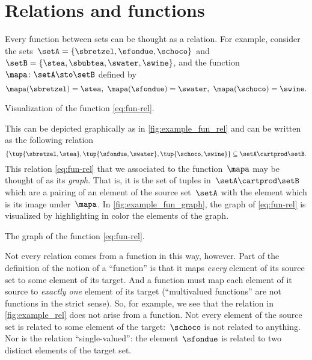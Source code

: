 
\section{Relations and functions}


Every function between sets can be thought as a relation.
For example, consider the sets~$\setA = \{ \sbretzel, \sfondue, \schoco \}$ and~$\setB = \{ \stea, \sbubtea, \swater, \swine \}$, and the function~$\mapa \colon \setA \sto \setB$ defined by
\begin{equation}
    \mapa (\sbretzel) = \stea, \ \mapa (\sfondue) = \swater, \ \mapa(\schoco) = \swine.
\end{equation}
\begin{marginfigure}
    \centering
    \caption{Visualization of the function \cref{eq:fun-rel}.}
    \label{fig:example_fun_rel}
\end{marginfigure}
This can be depicted graphically as in \cref{fig:example_fun_rel} and can be written as the following relation
\begin{equation}
    \label{eq:fun-rel}
    \{ \tup{\sbretzel, \stea}, \tup{\sfondue, \swater}, \tup{\schoco, \swine} \} \subseteq \setA \cartprod \setB.
\end{equation}
This relation \cref{eq:fun-rel} that we associated to the function~$\mapa$ may be thought of as its \emph{graph}.
That is, it is the set of tuples in~$\setA \cartprod \setB$ which are a pairing of an element of the source set~$\setA$ with the element which is its image under~$\mapa$.
In \cref{fig:example_fun_graph}, the graph of \cref{eq:fun-rel} is visualized by highlighting in color the elements of the graph.
\begin{marginfigure}
    \centering
    \caption{The graph of the function \cref{eq:fun-rel}.}
    \label{fig:example_fun_graph}
\end{marginfigure}

Not every relation comes from a function in this way, however.
Part of the definition of the notion of a ``function'' is that it maps \emph{every} element of its source set to some element of its target.
And a function must map each element of it source to \emph{exactly one} element of its target (``multivalued functions'' are not functions in the strict sense).
So, for example, we see that the relation in \cref{fig:example_rel} does not arise from a function.
Not every element of the source set is related to some element of the target:~$\schoco$ is not related to anything.
Nor is the relation ``single-valued'': the element~$\sfondue$ is related to two distinct elements of the target set.

